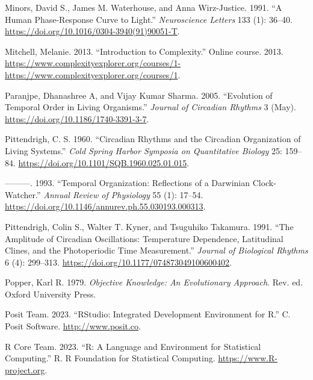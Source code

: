 \documentclass[
  12pt,
  a4paper,
  oneside]{tesesusp}
\newlength{\cslhangindent}
\newlength{\cslentryspacingunit} %
\newenvironment{CSLReferences}[2] %
 {%
  \setlength{\parindent}{0pt}
  \ifodd #1
  \let\oldpar\par
  \def\par{\hangindent=\cslhangindent\oldpar}
  \fi
  \setlength{\parskip}{#2\cslentryspacingunit}
 }%
 {}
\begin{document}
\begin{CSLReferences}{1}{0}
\leavevmode{}%
Minors, David S., James M. Waterhouse, and Anna Wirz-Justice. 1991. {``A
Human Phase-Response Curve to Light.''} \emph{Neuroscience Letters} 133
(1): 36--40. \url{https://doi.org/10.1016/0304-3940(91)90051-T}.

\leavevmode{}%
Mitchell, Melanie. 2013. {``Introduction to Complexity.''} Online
course. 2013.
\url{https://www.complexityexplorer.org/courses/1-https://www.complexityexplorer.org/courses/1}.

\leavevmode{}%
Paranjpe, Dhanashree A, and Vijay Kumar Sharma. 2005. {``Evolution of
Temporal Order in Living Organisms.''} \emph{Journal of Circadian
Rhythms} 3 (May). \url{https://doi.org/10.1186/1740-3391-3-7}.

\leavevmode{}%
Pittendrigh, C. S. 1960. {``Circadian Rhythms and the Circadian
Organization of Living Systems.''} \emph{Cold Spring Harbor Symposia on
Quantitative Biology} 25: 159--84.
\url{https://doi.org/10.1101/SQB.1960.025.01.015}.

\leavevmode{}%
---------. 1993. {``Temporal Organization: Reflections of a Darwinian
Clock-Watcher.''} \emph{Annual Review of Physiology} 55 (1): 17--54.
\url{https://doi.org/10.1146/annurev.ph.55.030193.000313}.

\leavevmode{}%
Pittendrigh, Colin S., Walter T. Kyner, and Tsuguhiko Takamura. 1991.
{``The Amplitude of Circadian Oscillations: Temperature Dependence,
Latitudinal Clines, and the Photoperiodic Time Measurement.''}
\emph{Journal of Biological Rhythms} 6 (4): 299--313.
\url{https://doi.org/10.1177/074873049100600402}.

\leavevmode{}%
Popper, Karl R. 1979. \emph{Objective Knowledge: An Evolutionary
Approach}. Rev. ed. Oxford University Press.

\leavevmode{}%
Posit Team. 2023. {``RStudio: Integrated Development Environment for
R.''} C. Posit Software. \url{http://www.posit.co}.

\leavevmode{}%
R Core Team. 2023. {``R: A Language and Environment for Statistical
Computing.''} R. R Foundation for Statistical Computing.
\url{https://www.R-project.org}.


\end{CSLReferences}
\end{document}
